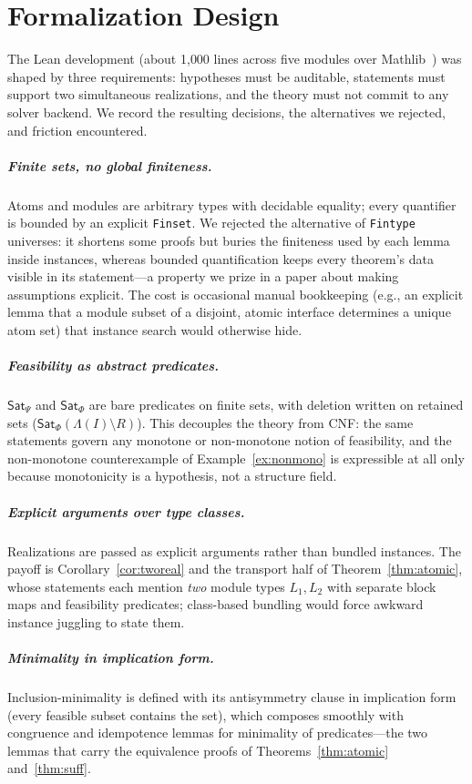 \documentclass[sigplan,10pt,review,anonymous,nonacm]{acmart}
\theoremstyle{acmdefinition}
\newcommand{\code}[1]{\texttt{#1}}
\newcommand{\Lam}{\Lambda}
\newcommand{\SatPsi}{{\mathsf{Sat}_\Psi}}
\newcommand{\SatPhi}{{\mathsf{Sat}_\Phi}}
\begin{document}
\section{Formalization Design}
\label{sec:design}

The Lean development (about 1{,}000 lines across five modules over
Mathlib~\cite{mathlib2020}) was shaped by three requirements: hypotheses must
be auditable, statements must support two simultaneous realizations, and the
theory must not commit to any solver backend. We record the resulting
decisions, the alternatives we rejected, and friction encountered.

\subparagraph*{Finite sets, no global finiteness.} Atoms and modules are
arbitrary types with decidable equality; every quantifier is bounded by an
explicit \code{Finset}. We rejected the alternative of \code{Fintype}
universes: it shortens some proofs but buries the finiteness used by each
lemma inside instances, whereas bounded quantification keeps every theorem's
data visible in its statement---a property we prize in a paper about making
assumptions explicit. The cost is occasional manual bookkeeping
(e.g., an explicit lemma that a module subset of a disjoint, atomic interface
determines a unique atom set) that instance search would otherwise hide.

\subparagraph*{Feasibility as abstract predicates.} $\SatPsi$ and $\SatPhi$
are bare predicates on finite sets, with deletion written on retained sets
($\SatPhi(\Lam(I)\setminus R)$). This decouples the theory from CNF: the same
statements govern any monotone or non-monotone notion of feasibility, and the
non-monotone counterexample of Example~\ref{ex:nonmono} is expressible at
all only because monotonicity is a hypothesis, not a structure field.

\subparagraph*{Explicit arguments over type classes.} Realizations are passed
as explicit arguments rather than bundled instances. The payoff is
Corollary~\ref{cor:tworeal} and the transport half of
Theorem~\ref{thm:atomic}, whose statements each mention \emph{two} module
types $L_1, L_2$ with separate block maps and feasibility predicates;
class-based bundling would force awkward instance juggling to state them.

\subparagraph*{Minimality in implication form.} Inclusion-minimality is
defined with its antisymmetry clause in implication form (every feasible
subset contains the set), which composes smoothly with congruence and
idempotence lemmas for minimality of predicates---the two lemmas that carry
the equivalence proofs of Theorems~\ref{thm:atomic} and~\ref{thm:suff}.
\end{document}
